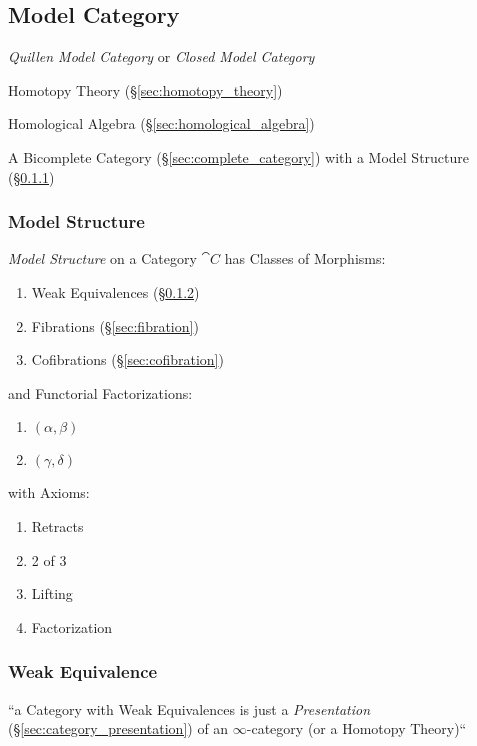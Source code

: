 \subsection{Model Category}\label{sec:model_category}

\emph{Quillen Model Category} or \emph{Closed Model Category}

Homotopy Theory (\S\ref{sec:homotopy_theory})

Homological Algebra (\S\ref{sec:homological_algebra})

A Bicomplete Category (\S\ref{sec:complete_category}) with a Model
Structure (\S\ref{sec:model_structure})



\subsubsection{Model Structure}\label{sec:model_structure}

\emph{Model Structure} on a Category $\cat{C}$ has Classes of
Morphisms:
\begin{enumerate}
  \item Weak Equivalences (\S\ref{sec:weak_equivalence})
  \item Fibrations (\S\ref{sec:fibration})
  \item Cofibrations (\S\ref{sec:cofibration})
\end{enumerate}
and Functorial Factorizations:
\begin{enumerate}
  \item $(\alpha,\beta)$
  \item $(\gamma,\delta)$
\end{enumerate}
with Axioms:
\begin{enumerate}
  \item Retracts
  \item 2 of 3
  \item Lifting
  \item Factorization
\end{enumerate} %




\subsubsection{Weak Equivalence}\label{sec:weak_equivalence}

``a Category with Weak Equivalences is just a \emph{Presentation}
(\S\ref{sec:category_presentation}) of an $\infty$-category (or a Homotopy
Theory)``

